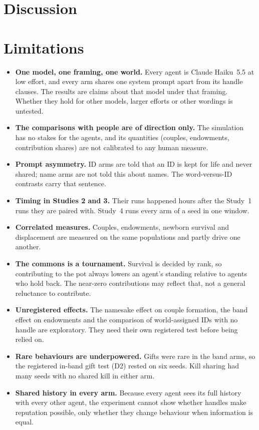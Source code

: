 \documentclass[11pt]{article}
\begin{document}


\section{Discussion}
\label{sec:discussion}



\section{Limitations}
\label{sec:limits}

\begin{itemize}
  \item \textbf{One model, one framing, one world.} Every agent is Claude Haiku~5.5 at low effort,
        and every arm shares one system prompt apart from its handle clauses. The results are
        claims about that model under that framing. Whether they hold for other models, larger
        efforts or other wordings is untested.
  \item \textbf{The comparisons with people are of direction only.} The simulation has no stakes
        for the agents, and its quantities (couples, endowments, contribution shares) are not
        calibrated to any human measure.
  \item \textbf{Prompt asymmetry.} ID arms are told that an ID is kept for life and never shared;
        name arms are not told this about names. The word-versus-ID contrasts carry that
        sentence.
  \item \textbf{Timing in Studies 2 and 3.} Their runs happened hours after the Study~1 runs they
        are paired with. Study~4 runs every arm of a seed in one window.
  \item \textbf{Correlated measures.} Couples, endowments, newborn survival and displacement are
        measured on the same populations and partly drive one another.
  \item \textbf{The commons is a tournament.} Survival is decided by rank, so contributing to the
        pot always lowers an agent's standing relative to agents who hold back. The near-zero
        contributions may reflect that, not a general reluctance to contribute.
  \item \textbf{Unregistered effects.} The namesake effect on couple formation, the band effect
        on endowments and the comparison of world-assigned IDs with no handle are exploratory.
        They need their own registered test before being relied on.
  \item \textbf{Rare behaviours are underpowered.} Gifts were rare in the band arms, so the
        registered in-band gift test (D2) rested on six seeds. Kill sharing had many seeds with no
        shared kill in either arm.
  \item \textbf{Shared history in every arm.} Because every agent sees its full history with
        every other agent, the experiment cannot show whether handles make reputation possible,
        only whether they change behaviour when information is equal.
\end{itemize}
\end{document}
